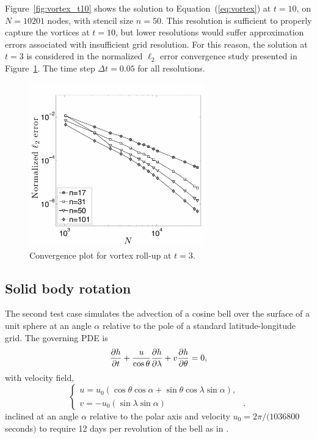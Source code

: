 Figure~\ref{fig:vortex_t10} shows the solution to Equation~(\ref{eq:vortex}) at $t = 10$, on $N=10201$ nodes, with stencil size $n=50$. This resolution is sufficient to properly capture the vortices at $t=10$, but lower resolutions would suffer approximation errors associated with insufficient grid resolution. 
For this reason, the solution at $t=3$ is considered in the normalized $\ell_2$ error convergence study presented in Figure~\ref{fig:conv_plot_vortex_hv}. The time step $\Delta t = 0.05$ for all resolutions.

\begin{figure}[htbp!]
\begin{center}
\includegraphics[width=3in] {figures/paper1/figures/vortex_rollup/convergence_plot_hv.pdf}
\caption{Convergence plot for vortex roll-up at $t=3$. }
\label{fig:conv_plot_vortex_hv}
\end{center}
\end{figure}

\subsection{Solid body rotation}

The second test case simulates the advection of a cosine bell over the surface of a unit sphere at an angle $\alpha$ relative to the pole of a standard latitude-longitude grid. The governing PDE is
\begin{equation}
\frac{\partial h}{\partial t} + \frac{u}{\cos \theta} \frac{\partial h}{\partial \lambda} + v \frac{\partial h}{\partial \theta} = 0, \label{eq:cosine_bell}
\end{equation}
with velocity field,
\begin{equation*}
\begin{cases}
u =  u_0 (\cos \theta \cos \alpha + \sin \theta \cos \lambda \sin \alpha),  & \\
v =  -u_0(\sin \lambda \sin \alpha) &.
\end{cases}
\end{equation*}
inclined at an angle $\alpha$ relative to the polar axis and velocity $u_0 = 2 \pi / (1036800$ seconds$)$ to require 12 days per revolution of the bell as in \cite{NairTransport05, FlyerWright07}.

